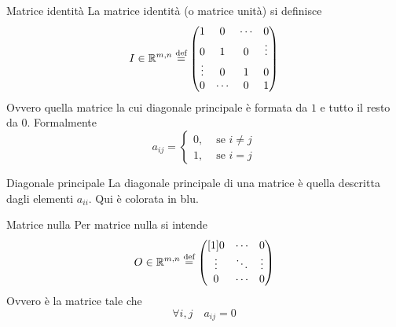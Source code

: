 \begin{Def}{Matrice identità}
  La matrice identità (o matrice unità) si definisce
  \begin{equation*}
    I\in\mathbb{R}^{m,n}\overset{\text{def}}{=}
    \begin{pmatrix}
      1 & 0 & \cdots & 0\\
      0 & 1 & 0 & \vdots\\
      \vdots & 0 & 1 & 0\\
      0 & \cdots & 0 & 1
    \end{pmatrix}
  \end{equation*}
  Ovvero quella matrice la cui diagonale principale è formata da $1$ e tutto il resto da
  $0$. Formalmente
  \begin{equation*}
    a_{ij} =
    \begin{cases}
      0, &\text{ se }i\neq j\\
      1, &\text{ se }i=j
    \end{cases}
  \end{equation*}
\end{Def}

\begin{Def}{Diagonale principale}
  La diagonale principale di una matrice è quella descritta dagli elementi $a_{ii}$. Qui
  è colorata in blu.
  \begin{center}
  \end{center}
\end{Def}

\begin{Def}{Matrice nulla}
  Per matrice nulla si intende
  \begin{equation*}
    O\in\mathbb{R}^{m,n}\overset{\text{def}}{=}
    \begin{pmatrix}[1]
      0&\cdots&0\\
      \vdots & \ddots & \vdots\\
      0 & \cdots & 0
    \end{pmatrix}
  \end{equation*}
  Ovvero è la matrice tale che
  \begin{equation*}
    \forall i,j \quad a_{ij}=0
  \end{equation*}
\end{Def}

